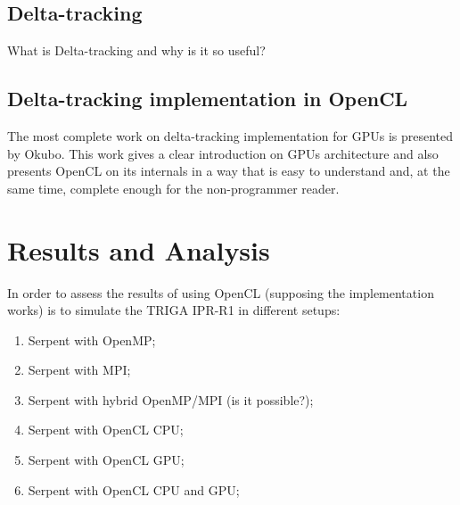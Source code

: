 \documentclass[twoside,a4paper,12pt,english]{anstrans}
\renewcommand{\vec}[1]{\bm{#1}} %
\newcommand{\vd}{\bm{\cdot}} %
\newcommand{\grad}{\vec{\nabla}} %
\newcommand{\ud}{\mathop{}\!\mathrm{d}} %
\begin{document}
\subsection{Delta-tracking}

What is Delta-tracking and why is it so useful?

\subsection{Delta-tracking implementation in OpenCL}

The most complete work on delta-tracking implementation for GPUs is presented
by Okubo\cite{Okubo2016}. This work gives a clear introduction on GPUs architecture
and also presents OpenCL on its internals in a way that is easy to understand and,
at the same time, complete enough for the non-programmer reader.

\iffalse
\begin{subequations} \label{eqs:fullTransport}
\begin{multline} \label{eq:fullTransportVol}
  \vec{\Omega}\vd \grad \psi(\vec{x}, \vec{\Omega})
  + \sigma(\vec{x}) \psi (\vec{x}, \vec{\Omega})
\\ =
  \frac{\sigma_s(\vec{x})}{4\pi} \int_{4\pi} \psi(\vec{x},\vec{\Omega}')
  \ud\Omega' + \frac{q(\vec{x})}{4\pi}
  \equiv \frac{1}{4\pi} Q(\vec{x}) \,,
\end{multline}
inside $\vec{x} \in V$, $\vec{\Omega} \in 4\pi$, with an incident boundary
condition
\begin{equation} \label{eq:fullTransportBndy}
  \psi(\vec{x}, \vec{\Omega}) = \psi^b(\vec{x}, \vec{\Omega}) \,,
 \quad \vec{x} \in \partial V, \ \vec{\Omega} \vd \vec{n} < 0\,.
\end{equation}
\end{subequations}
\fi

\section{Results and Analysis}

In order to assess the results of using OpenCL (supposing the implementation works)
is to simulate the TRIGA IPR-R1 in different setups:
\begin{enumerate}
\item Serpent with OpenMP;
\item Serpent with MPI;
\item Serpent with hybrid OpenMP/MPI (is it possible?);
\item Serpent with OpenCL CPU;
\item Serpent with OpenCL GPU;
  \item Serpent with OpenCL CPU and GPU;
  \end{enumerate}
\end{document}
